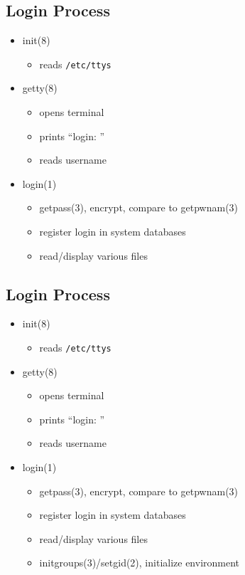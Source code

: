 \documentclass[xga]{xdvislides}
\begin{document}
\subsection{Login Process}
\begin{itemize}
	\item init(8)
		\begin{itemize}
			\item reads {\tt /etc/ttys}
		\end{itemize}
	\item getty(8)
		\begin{itemize}
			\item opens terminal
			\item prints ``login: ''
			\item reads username
		\end{itemize}
	\item login(1)
		\begin{itemize}
			\item getpass(3), encrypt, compare to getpwnam(3)
			\item register login in system databases
			\item read/display various files
		\end{itemize}
\end{itemize}

\subsection{Login Process}
\begin{itemize}
	\item init(8)
		\begin{itemize}
			\item reads {\tt /etc/ttys}
		\end{itemize}
	\item getty(8)
		\begin{itemize}
			\item opens terminal
			\item prints ``login: ''
			\item reads username
		\end{itemize}
	\item login(1)
		\begin{itemize}
			\item getpass(3), encrypt, compare to getpwnam(3)
			\item register login in system databases
			\item read/display various files
			\item initgroups(3)/setgid(2), initialize environment
		\end{itemize}
\end{itemize}
\end{document}
